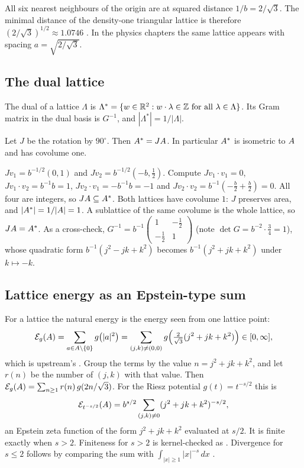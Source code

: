 All six nearest neighbours of the origin are at squared distance $1/b=2/\sqrt3$. The minimal distance of the
density-one triangular lattice is therefore $(2/\sqrt3)^{1/2}\approx1.0746$ \tierC{}. In the physics chapters the same
lattice appears with spacing $a=\sqrt{2/\sqrt3}$.

\subsection{The dual lattice}

\begin{definition}
The dual of a lattice $\Lambda$ is $\Lambda^*=\{w\in\mathbb{R}^2: w\cdot\lambda\in\mathbb{Z}\text{ for all }\lambda\in\Lambda\}$.
Its Gram matrix in the dual basis is $G^{-1}$, and $|\Lambda^*|=1/|\Lambda|$.
\end{definition}

\begin{proposition}\label{prop:dual}
Let $J$ be the rotation by $90^\circ$. Then $A^*=JA$. In particular $A^*$ is isometric to $A$ and has
covolume one.
\end{proposition}
\begin{humanproof}
$Jv_1=b^{-1/2}(0,1)$ and $Jv_2=b^{-1/2}(-b,\tfrac12)$. Compute $Jv_1\cdot v_1=0$, $Jv_1\cdot v_2=b^{-1}b=1$,
$Jv_2\cdot v_1=-b^{-1}b=-1$ and $Jv_2\cdot v_2=b^{-1}(-\tfrac b2+\tfrac b2)=0$. All four are integers, so
$JA\subseteq A^*$. Both lattices have covolume $1$: $J$ preserves area, and $|A^*|=1/|A|=1$. A sublattice of
the same covolume is the whole lattice, so $JA=A^*$. As a cross-check, $G^{-1}=b^{-1}\begin{pmatrix}1&-\frac12\\-\frac12&1\end{pmatrix}$
(note $\det G=b^{-2}\cdot\tfrac34=1$), whose quadratic form $b^{-1}(j^2-jk+k^2)$ becomes $b^{-1}(j^2+jk+k^2)$ under
$k\mapsto-k$. \tierC{}
\end{humanproof}

\subsection{Lattice energy as an Epstein-type sum}

For a lattice the natural energy is the energy seen from one lattice point:
\[
  \mathcal E_g(A)=\sum_{a\in A\setminus\{0\}}g\bigl(|a|^2\bigr)
  =\sum_{(j,k)\ne(0,0)} g\Bigl(\tfrac{2}{\sqrt3}(j^2+jk+k^2)\Bigr)\in[0,\infty],
\]
which is upstream's . Group the terms by the value $n=j^2+jk+k^2$, and let $r(n)$ be the number of
$(j,k)$ with that value. Then $\mathcal E_g(A)=\sum_{n\ge1}r(n)\,g(2n/\sqrt3)$. For the Riesz potential
$g(t)=t^{-s/2}$ this is
\[
  \mathcal E_{t^{-s/2}}(A)=b^{s/2}\sum_{(j,k)\ne0}(j^2+jk+k^2)^{-s/2},
\]
an Epstein zeta function of the form $j^2+jk+k^2$ evaluated at $s/2$. It is finite exactly when $s>2$. Finiteness for
$s>2$ is kernel-checked as  \tierA{}. Divergence for $s\le2$ follows by comparing the
sum with $\int_{|x|\ge1}|x|^{-s}\,dx$ \tierC{}.

